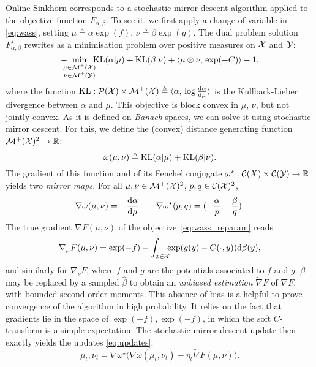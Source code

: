 Online Sinkhorn corresponds to a stochastic mirror descent algorithm applied to
the objective function $F_{\alpha, \beta}$. To see it, we first apply a change
of variable in \eqref{eq:wass}, setting $\mu \triangleq \alpha \exp(f)$, $\nu
\triangleq \beta \exp(g)$. The dual problem solution $F_{\alpha, \beta}^\star$
rewrites as a minimisation problem over positive measures on $\mathcal{X}$ and $\mathcal{Y}$:
\begin{equation}\label{eq:wass_reparam}
    - \!\!\!\!\min_{\substack{\mu \in \mathcal{M}^+(\mathcal{X}) \\ 
    \nu \in \mathcal{M}^+(\mathcal{Y})}} \!\!\!\textrm{KL}(\alpha | \mu)
    + \textrm{KL}(\beta | \nu) + \langle \mu \otimes \nu,\,\exp(-C)\rangle - 1,
\end{equation}
where the function $\textrm{KL}: \mathcal{P}(\mathcal{X}) \times \mathcal{M}^+(\mathcal{X}) \triangleq \langle \alpha,\,
    \log \frac{\textrm{d} \alpha}{\textrm{d} \mu}\rangle$ is the Kullback-Lieber divergence between
$\alpha$ and $\mu$. This objective is block convex in $\mu$, $\nu$, but not jointly convex. As it is defined on \textit{Banach} spaces, we can solve it using stochastic mirror descent. For this, we define the (convex) distance generating function $\mathcal{M}^+(\mathcal{X})^2 \to \mathbb{R}$:
\begin{equation}
    \omega(\mu, \nu) \triangleq \textrm{KL}(\alpha | \mu) + \textrm{KL}(\beta | \nu).
\end{equation}
The gradient of this function and of its Fenchel conjugate $\omega^\star: \mathcal{C}(X)
\times \mathcal{C}(\mathcal{Y}) \to \mathbb{R}$ yields two \textit{mirror maps}. For all $\mu, \nu \in
\mathcal{M}^+(\mathcal{X})^2$, $p, q \in \mathcal{C}(\mathcal{X})^2$,
\begin{equation}
    \nabla \omega(\mu, \nu) = - \frac{\textrm{d} \alpha}{\textrm{d} \mu}
    \qquad \nabla \omega^\star(p, q) = (-\frac{\alpha}{p}, -\frac{\beta}{q}).
\end{equation}
The true gradient $\nabla F(\mu, \nu)$ of the objective~\eqref{eq:wass_reparam} reads
\begin{equation}
    \nabla_\mu F(\mu, \nu) = \exp(-f) - 
    \int_{x \in \mathcal{X}} \!\!\! \exp(g(y) - C(\cdot, y))\textrm{d} \beta(y),
\end{equation}
and similarly for $\nabla_\nu F$, where $f$ and $g$ are the potentials associated
to $f$ and $g$. $\beta$ may be replaced by a sampled $\hat \beta$ to obtain an
\textit{unbiased estimation} $\tilde \nabla F$ of $\nabla F$, with bounded second order moments.
This absence of bias is a helpful to prove convergence of the algorithm in high
probability. It relies on the fact that gradients lie in the space of $\exp(-f),
\exp(-f)$, in which the soft $C$-transform is a simple expectation. The stochastic
mirror descent update then exactly yields the updates \eqref{eq:updates}:
% 
\begin{equation}
    \mu_t, \nu_t = \nabla \omega^\star\Big( \nabla \omega(\mu_t, \nu_t) - 
    \eta_t \tilde \nabla F(\mu, \nu)\Big).
\end{equation}

